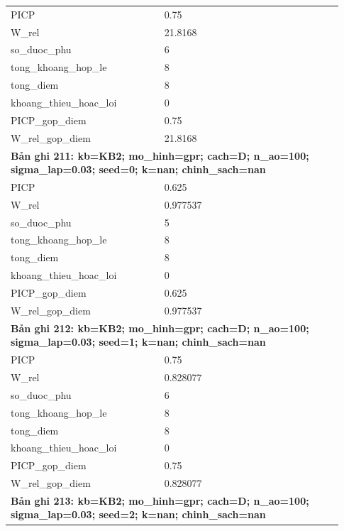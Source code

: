 \begin{longtable}{p{0.43\linewidth}p{0.50\linewidth}}
PICP & 0.75 \\
W\_\allowbreak rel & 21.8168 \\
so\_\allowbreak duoc\_\allowbreak phu & 6 \\
tong\_\allowbreak khoang\_\allowbreak hop\_\allowbreak le & 8 \\
tong\_\allowbreak diem & 8 \\
khoang\_\allowbreak thieu\_\allowbreak hoac\_\allowbreak loi & 0 \\
PICP\_\allowbreak gop\_\allowbreak diem & 0.75 \\
W\_\allowbreak rel\_\allowbreak gop\_\allowbreak diem & 21.8168 \\
\midrule
\multicolumn{2}{p{0.95\linewidth}}{\textbf{Bản ghi 211: kb=KB2; mo\_hinh=gpr; cach=D; n\_ao=100; sigma\_lap=0.03; seed=0; k=nan; chinh\_sach=nan}} \\
PICP & 0.625 \\
W\_\allowbreak rel & 0.977537 \\
so\_\allowbreak duoc\_\allowbreak phu & 5 \\
tong\_\allowbreak khoang\_\allowbreak hop\_\allowbreak le & 8 \\
tong\_\allowbreak diem & 8 \\
khoang\_\allowbreak thieu\_\allowbreak hoac\_\allowbreak loi & 0 \\
PICP\_\allowbreak gop\_\allowbreak diem & 0.625 \\
W\_\allowbreak rel\_\allowbreak gop\_\allowbreak diem & 0.977537 \\
\midrule
\multicolumn{2}{p{0.95\linewidth}}{\textbf{Bản ghi 212: kb=KB2; mo\_hinh=gpr; cach=D; n\_ao=100; sigma\_lap=0.03; seed=1; k=nan; chinh\_sach=nan}} \\
PICP & 0.75 \\
W\_\allowbreak rel & 0.828077 \\
so\_\allowbreak duoc\_\allowbreak phu & 6 \\
tong\_\allowbreak khoang\_\allowbreak hop\_\allowbreak le & 8 \\
tong\_\allowbreak diem & 8 \\
khoang\_\allowbreak thieu\_\allowbreak hoac\_\allowbreak loi & 0 \\
PICP\_\allowbreak gop\_\allowbreak diem & 0.75 \\
W\_\allowbreak rel\_\allowbreak gop\_\allowbreak diem & 0.828077 \\
\midrule
\multicolumn{2}{p{0.95\linewidth}}{\textbf{Bản ghi 213: kb=KB2; mo\_hinh=gpr; cach=D; n\_ao=100; sigma\_lap=0.03; seed=2; k=nan; chinh\_sach=nan}} \\

\end{longtable}
